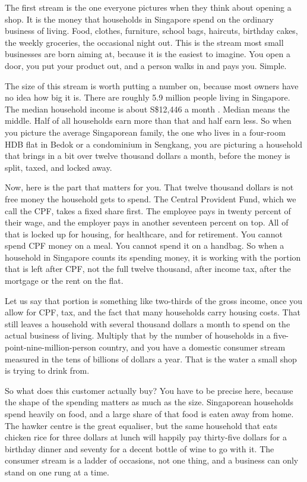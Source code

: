 \documentclass[10pt,twoside,openany]{memoir}
\begin{document}
{{{{{{{{{{{{{{The first stream is the one everyone pictures when they think about
opening a shop. It is the money that households in Singapore spend on
the ordinary business of living. Food, clothes, furniture, school bags,
haircuts, birthday cakes, the weekly groceries, the occasional night
out. This is the stream most small businesses are born aiming at,
because it is the easiest to imagine. You open a door, you put your
product out, and a person walks in and pays you. Simple.

The size of this stream is worth putting a number on, because most
owners have no idea how big it is. There are roughly 5.9 million people
living in Singapore. The median household income is about S\$12,446 a
month \cite{singstat-income}. Median means the middle. Half of all
households earn more than that and half earn less. So when you picture
the average Singaporean family, the one who lives in a four-room HDB
flat in Bedok or a condominium in Sengkang, you are picturing a
household that brings in a bit over twelve thousand dollars a month,
before the money is split, taxed, and locked away.

Now, here is the part that matters for you. That twelve thousand dollars
is not free money the household gets to spend. The Central Provident
Fund, which we call the CPF, takes a fixed share first. The employee
pays in twenty percent of their wage, and the employer pays in another
seventeen percent on top. All of that is locked up for housing, for
healthcare, and for retirement. You cannot spend CPF money on a meal.
You cannot spend it on a handbag. So when a household in Singapore
counts its spending money, it is working with the portion that is left
after CPF, not the full twelve thousand, after income tax, after the
mortgage or the rent on the flat.

Let us say that portion is something like two-thirds of the gross
income, once you allow for CPF, tax, and the fact that many households
carry housing costs. That still leaves a household with several thousand
dollars a month to spend on the actual business of living. Multiply that
by the number of households in a five-point-nine-million-person country,
and you have a domestic consumer stream measured in the tens of billions
of dollars a year. That is the water a small shop is trying to drink
from.

So what does this customer actually buy? You have to be precise here,
because the shape of the spending matters as much as the size.
Singaporean households spend heavily on food, and a large share of that
food is eaten away from home. The hawker centre is the great equaliser,
but the same household that eats chicken rice for three dollars at lunch
will happily pay thirty-five dollars for a birthday dinner and seventy
for a decent bottle of wine to go with it. The consumer stream is a
ladder of occasions, not one thing, and a business can only stand on one
rung at a time.

}}}}}}}}}}}}}}
\end{document}
